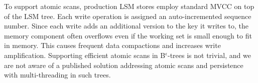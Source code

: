 To support atomic scans, production LSM stores employ standard MVCC on top of the LSM tree.  
Each write operation is assigned an auto-incremented sequence number. Since each write adds an additional version to the key it writes to, the memory component often overflows  even if the working set is small enough to fit in memory. This causes frequent data compactions and increases write amplification.
Supporting efficient atomic scans in B$^\epsilon$-trees is not trivial, and we are not aware of a published solution addressing atomic scans and persistence with multi-threading in such trees.


